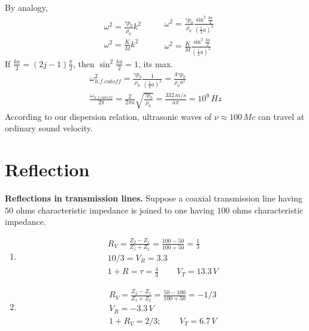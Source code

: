 \documentclass[twoside,10pt]{amsart}
\newcommand{\problemhead}[1]
  {\smallskip
   \noindent{\large\bf Problem #1.}
   \smallskip}
\begin{document}
By analogy,
\[
\begin{aligned}
&  \omega^2 = \frac{ \gamma p_0}{ \rho_0} k^2  \\
&  \omega^2 = \frac{K}{M} k^2 
\end{aligned} \quad \, 
\begin{aligned}
  & \omega^2 = \frac{ \gamma p_0}{ \rho_0} \frac{ \sin^2{ \frac{ka}{2} } }{ \left( \frac{1}{2} a \right)^2 } \\
  & \omega^2 = \frac{ K}{M} \frac{ \sin^2{ \frac{ka}{2} } }{ \left( \frac{1}{2} a \right)^2 }
\end{aligned}
\]
If $\frac{ka}{2} = (2j-1) \frac{\pi}{2}$, then $\sin^2{ \frac{ka}{2} } = 1$, its max. \\
\[
\begin{gathered}
  \omega_{h.f. cutoff}^2 = \frac{ \gamma p_0}{ \rho_0} \frac{1}{ \left( \frac{1}{2} a \right)^2 } = \frac{4 \gamma p_0}{ \rho_0 a^2 } \\
  \frac{ \omega_{h.f. cutoff} }{ 2 \pi } = \frac{2 }{ 2\pi a } \sqrt{ \frac{ \gamma p_0}{ \rho_0 } } = \frac{ 332 \, m/s}{ a \pi } = 10^9 \, Hz 
\end{gathered}
\]
According to our dispersion relation, ultrasonic waves of $\nu \approx 100 \, Mc$ can travel at ordinary sound velocity.   

\section{ Reflection }

\problemhead{5.5} \textbf{ Reflections in transmission lines.}  Suppose a coaxial transmission line having $50$ ohms characteristic impedance is joined to one having $100$ ohms characteristic impedance.  
\begin{enumerate}
\item \[
\begin{gathered}
  R_V = \frac{Z_2 - Z_1}{Z_1 + Z_2} = \frac{100 - 50}{100 +50} = \frac{1}{3} \\
  10/3 = V_R = 3.3 \\
  1+R = \tau = \frac{4}{3} \quad \quad \, V_T = 13.3 \, V
\end{gathered}
\]
\item \[
\begin{gathered}
  R_V = \frac{Z_2 - Z_1}{Z_1 + Z_2 } = \frac{50 - 100 }{ 100 + 50 } = -1/3 \\
  V_R = -3.3 \, V \\
  1+R_V = 2/3; \quad \quad \, V_T = 6.7 \, V
\end{gathered}
\]
\end{enumerate}
\end{document}
